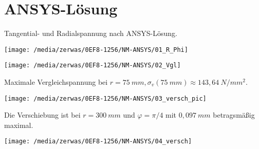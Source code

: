 \documentclass[]{article}
\begin{document}
\section{ANSYS-L\"osung}
Tangential- und Radialspannung nach ANSYS-L\"osung.\\
\begin{center}
\texttt{[image: /media/zerwas/0EF8-1256/NM-ANSYS/01\_R\_Phi]}
\end{center}
\begin{center}
\texttt{[image: /media/zerwas/0EF8-1256/NM-ANSYS/02\_Vgl]}
\end{center}
Maximale Vergleichspannung bei $r=75\ mm, \sigma_v(75\ mm)\approx 143,64\ N/mm^2$.\\
\begin{center}
\texttt{[image: /media/zerwas/0EF8-1256/NM-ANSYS/03\_versch\_pic]}
\end{center}
Die Verschiebung ist bei $r=300\ mm$ und $\varphi=\pi/4$ mit $0,097\ mm$ betragsm\"aßig maximal.
\begin{center}
\texttt{[image: /media/zerwas/0EF8-1256/NM-ANSYS/04\_versch]}
\end{center}
\end{document}
